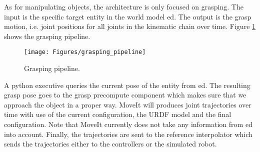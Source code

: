 As for manipulating objects, the architecture is only focused on grasping. The input is the specific target entity in the world model \acrshort{ed}. The output is the grasp motion, i.e. joint positions for all joints in the kinematic chain over time. Figure \ref{fig:grasping_pipeline} shows the grasping pipeline.
\begin{figure}[h]
    \centering
    \vspace{-0.3cm}
	\texttt{[image: Figures/grasping\_pipeline]}
    \vspace{-1em}
	\caption{Grasping pipeline.}
	\label{fig:grasping_pipeline}
    \vspace{-0.5cm}
\end{figure}
A python executive queries the current pose of the entity from \acrshort{ed}. The resulting grasp pose goes to the grasp precompute component which makes sure that we approach the object in a proper way. MoveIt will produces joint trajectories over time with use of the current configuration, the URDF model and the final configuration. Note that MoveIt currently does not take any information from \acrshort{ed} into account. Finally, the trajectories are sent to the reference interpolator which sends the trajectories either to the controllers or the simulated robot. 